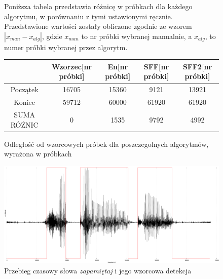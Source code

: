 \documentclass[eng,printmode]{mgr}
\begin{document}
	
	\begin{figure}
		Poniższa tabela przedstawia różnicę w próbkach dla każdego algorytmu, w porównaniu z tymi ustawionymi ręcznie. Przedstawione wartości zostały obliczone zgodnie ze wzorem $| x_{man}-x_{alg} |$, gdzie $x_{man}$ to nr próbki wybranej manualnie, a $x_{alg}$, to numer próbki wybranej przez algorytm. 
	 	\begin{center}
	 		\begin{tabular}{||c c c c c||} 
	 			\hline
			 			 &Wzorzec[nr próbki]& En[nr próbki] & SFF[nr próbki] & SFF2[nr próbki] \\ [0.5ex] 
	 			\hline
	 			Początek & 16705 & 15360 & 9121 & 13921 \\ 
	 			\hline
	 			Koniec & 59712 & 60000 & 61920 & 61920 \\
	 			\hline
	 			SUMA RÓŻNIC  & 0 & 1535 & 9792 & 4992 \\
	 			\hline
	 		\end{tabular}
	 		\caption{Odległość od wzorcowych próbek dla poszczegolnych algorytmów, wyrażona w próbkach}\vspace{5mm}
	 	\end{center}
	 	
	 	\begin{center}
	 		\includegraphics[scale=0.2]{zapamietaj.png}
	 		\caption{Przebieg czasowy słowa \emph{zapamiętaj} i jego wzorcowa detekcja}\vspace{5mm}
	 	\end{center}
	\end{figure}
 
\end{document}
